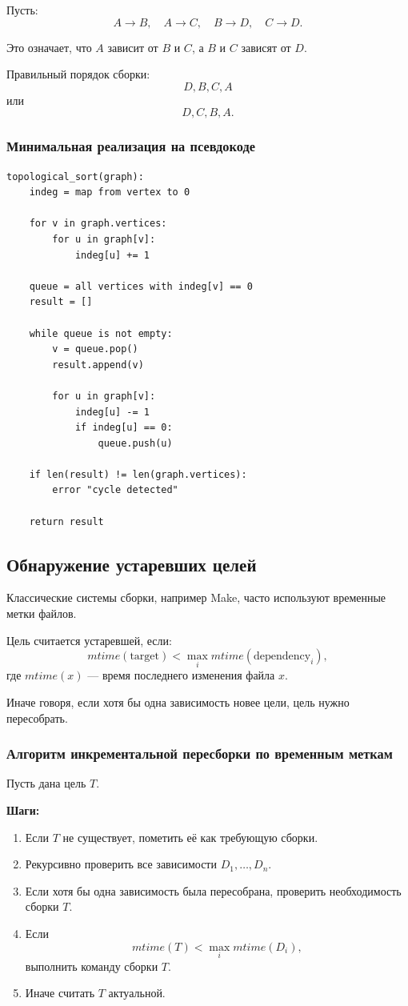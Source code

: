 \documentclass[12pt,a4paper]{article}
\begin{document}
Пусть:
\[
A \rightarrow B, \quad A \rightarrow C, \quad B \rightarrow D, \quad C \rightarrow D.
\]

Это означает, что $A$ зависит от $B$ и $C$, а $B$ и $C$ зависят от $D$.

Правильный порядок сборки:
\[
D, B, C, A
\]
или
\[
D, C, B, A.
\]

\subsubsection{Минимальная реализация на псевдокоде}

\begin{lstlisting}
topological_sort(graph):
    indeg = map from vertex to 0

    for v in graph.vertices:
        for u in graph[v]:
            indeg[u] += 1

    queue = all vertices with indeg[v] == 0
    result = []

    while queue is not empty:
        v = queue.pop()
        result.append(v)

        for u in graph[v]:
            indeg[u] -= 1
            if indeg[u] == 0:
                queue.push(u)

    if len(result) != len(graph.vertices):
        error "cycle detected"

    return result
\end{lstlisting}

\subsection{Обнаружение устаревших целей}

Классические системы сборки, например Make, часто используют временные метки файлов.

Цель считается устаревшей, если:
\[
mtime(\text{target}) < \max_i mtime(\text{dependency}_i),
\]
где $mtime(x)$ --- время последнего изменения файла $x$.

Иначе говоря, если хотя бы одна зависимость новее цели, цель нужно пересобрать.

\subsubsection{Алгоритм инкрементальной пересборки по временным меткам}

Пусть дана цель $T$.

\textbf{Шаги:}
\begin{enumerate}
    \item Если $T$ не существует, пометить её как требующую сборки.
    \item Рекурсивно проверить все зависимости $D_1,\ldots,D_n$.
    \item Если хотя бы одна зависимость была пересобрана, проверить необходимость сборки $T$.
    \item Если
    \[
    mtime(T) < \max_i mtime(D_i),
    \]
    выполнить команду сборки $T$.
    \item Иначе считать $T$ актуальной.
\end{enumerate}
\end{document}
